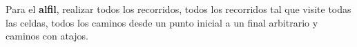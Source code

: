 Para el \textbf{alfil}, realizar todos los recorridos, todos los recorridos tal que visite todas las celdas, todos los caminos desde un punto inicial a un final arbitrario y caminos con atajos.